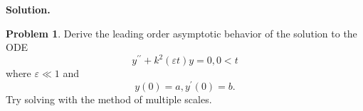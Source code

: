 \documentclass[a4paper]{book}
\newenvironment{solution}%
{\noindent\textbf{Solution.}}%
{\qedhere}
\numberwithin{equation}{chapter}
\theoremstyle{definition}
\newtheorem{pro}[exm]{Problem}
\begin{document}
\begin{solution}
  
\end{solution}


\begin{pro}
  Derive the leading order asymptotic behavior of the solution to the ODE
  \[y^{\prime \prime} + k^2(\varepsilon t)y = 0, 0 < t\]
  where $\varepsilon \ll 1$ and
  \[y(0) = a, y^\prime(0) = b.\]
  Try solving with the method of multiple scales.
\end{pro}
\end{document}

